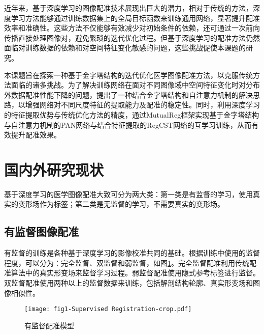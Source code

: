 近年来，基于深度学习的图像配准技术展现出巨大的潜力，相对于传统的方法，深度学习方法能够通过训练数据集上的全局目标函数来训练通用网络，显著提升配准效率和准确性。这些方法不仅能够有效减少对初始条件的依赖，还可通过一次前向传播直接处理图像对，避免繁琐的迭代优化过程。但基于深度学习的配准方法仍然面临对训练数据的依赖和对空间特征变化敏感的问题，这些挑战促使本课题的研究。

本课题旨在探索一种基于金字塔结构的迭代优化医学图像配准方法，以克服传统方法面临的诸多挑战。为了解决训练网络在面对不同图像域中空间特征变化时对分布外数据配准性能下降的问题，提出了一种结合金字塔结构和自注意力机制的解决思路，以增强网络对不同尺度特征的提取能力及配准的稳定性。同时，利用深度学习的特征提取优势与传统优化方法的精度，通过MutualReg框架\cite{liu2024mutualreg}实现基于金字塔结构与自注意力机制的PAN网络\cite{wang2024pyramid}与结合特征提取的RegCST网络\cite{bigalke2023unsupervised}的互学习训练，从而有效提升配准效果。


\section{国内外研究现状}

基于深度学习的医学图像配准大致可分为两大类：第一类是有监督的学习，使用真实的变形场作为标签；第二类是无监督的学习，不需要真实的变形场。

\subsection{有监督图像配准}

有监督的训练是各种基于深度学习的影像校准共同的基础。根据训练中使用的监督程度，可以分为：完全监督、双监督和弱监督，如图\ref{fig:1}。完全监督配准利用传统配准算法中的真实形变场来监督学习过程。弱监督配准使用隐式参考标签进行监督。双监督配准使用两种以上的监督数据来训练，包括解剖结构轮廓、真实形变场和图像相似性。

\begin{figure}[h]
    \centering
    \texttt{[image: fig1-Supervised Registration-crop.pdf]}
    \caption{有监督配准模型}
    \label{fig:1}
\end{figure}



